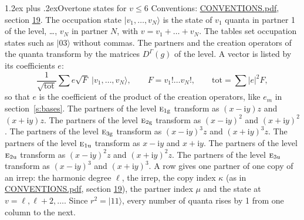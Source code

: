 \documentclass[10pt,a4paper]{article}
\makeatletter
\renewcommand\section{\@startsection{section}{1}{\z@}{-3ex plus -1ex minus -.2ex}%
  {1.2ex plus .2ex}{\normalfont\large\sffamily\bfseries\color{parttitle}}}
\numberwithin{equation}{section}
\newcommand{\irr}[1]{\text{\normalfont\scshape #1}}
\newcommand{\ptag}[1]{\mathrm{#1}}
\newcommand{\iunit}{\mathrm{i}}
\newcommand{\repD}[1]{D^{#1}}
\newcommand{\mult}{\kappa}
\newcommand{\intx}{\mu}
\newcommand{\occ}[1]{\lvert #1\rangle}
\makeatother
\begin{document}
\section{Overtone states for \texorpdfstring{$v \le 6$}{v \textleq\ 6}}\label{s:overtone_states}
Conventions: \href{../../CONVENTIONS.pdf}{CONVENTIONS.pdf}, section \href{../../CONVENTIONS.pdf\#conv.19}{19}.
\leavevmode\label{n:vector.occupation}\label{n:local.quanta.partner}\label{n:local.weight.occupation}The occupation state $\occ{v_1, \dots, v_N}$ is the state of $v_1$ quanta in partner 1 of the level, \dots, $v_N$ in partner $N$, with $v = v_1 + \dots + v_N$. The tables set occupation states such as $\occ{03}$ without commas. The partners and the creation operators of the quanta transform by the matrices $\repD{\Gamma}(g)$ of the level. A vector is listed by its coefficients $e$:
\begin{equation}\label{e:occupation}\frac{1}{\sqrt{\mathrm{tot}}}\sum e\sqrt{F}\;\occ{v_1, \dots, v_N},\qquad F = v_1!\dots v_N!,\qquad \mathrm{tot} = \sum |e|^2F,\end{equation}
so that $e$ is the coefficient of the product of the creation operators, like $e_m$ in section~\ref{s:bases}. The partners of the level $\irr{e}_{1\ptag{g}}$ transform as $(x - \iunit y) z$ and $(x + \iunit y) z$. The partners of the level $\irr{e}_{2\ptag{g}}$ transform as $(x - \iunit y)^{2}$ and $(x + \iunit y)^{2}$. The partners of the level $\irr{e}_{3\ptag{g}}$ transform as $(x - \iunit y)^{3} z$ and $(x + \iunit y)^{3} z$. The partners of the level $\irr{e}_{1\ptag{u}}$ transform as $x - \iunit y$ and $x + \iunit y$. The partners of the level $\irr{e}_{2\ptag{u}}$ transform as $(x - \iunit y)^{2} z$ and $(x + \iunit y)^{2} z$. The partners of the level $\irr{e}_{3\ptag{u}}$ transform as $(x - \iunit y)^{3}$ and $(x + \iunit y)^{3}$. A row gives one partner of one copy of an irrep: the harmonic degree $\ell$, the irrep, the copy index $\mult$ (as in \href{../../CONVENTIONS.pdf}{CONVENTIONS.pdf}, section \href{../../CONVENTIONS.pdf\#conv.19}{19}), the partner index $\intx$ and the state at $v = \ell, \ell + 2, \dots$. Since $r^2 = \occ{11}$, every number of quanta rises by 1 from one column to the next.
\end{document}

